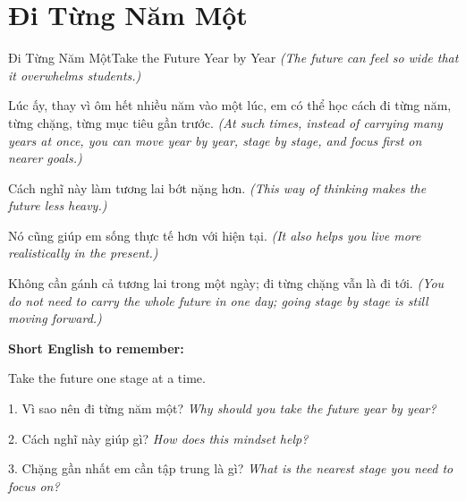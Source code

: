 \section{Đi Từng Năm Một}
\begin{truyen}{Đi Từng Năm Một}{Take the Future Year by Year}
\textit{(The future can feel so wide that it overwhelms students.)}

Lúc ấy, thay vì ôm hết nhiều năm vào một lúc, em có thể học cách đi từng năm, từng chặng, từng mục tiêu gần trước.
\textit{(At such times, instead of carrying many years at once, you can move year by year, stage by stage, and focus first on nearer goals.)}

Cách nghĩ này làm tương lai bớt nặng hơn.
\textit{(This way of thinking makes the future less heavy.)}

Nó cũng giúp em sống thực tế hơn với hiện tại.
\textit{(It also helps you live more realistically in the present.)}
\end{truyen}

\begin{baihoc}
Không cần gánh cả tương lai trong một ngày; đi từng chặng vẫn là đi tới.
\textit{(You do not need to carry the whole future in one day; going stage by stage is still moving forward.)}
\end{baihoc}

\begin{ghinhoanh}
\textbf{Short English to remember:}

Take the future one stage at a time.

\end{ghinhoanh}

\begin{tuhocnhanh}
1. Vì sao nên đi từng năm một? \textit{Why should you take the future year by year?}

2. Cách nghĩ này giúp gì? \textit{How does this mindset help?}

3. Chặng gần nhất em cần tập trung là gì? \textit{What is the nearest stage you need to focus on?}
\end{tuhocnhanh}
\ngancach

